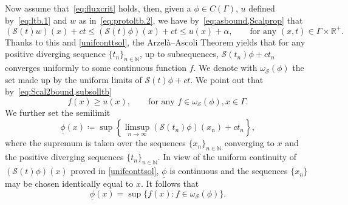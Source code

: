 \documentclass[11pt,a4paper,american]{article}
\newcommand{\Nds}{\mathds N}
\newcommand{\Rds}{\mathds R}
\newcommand{\Scal}{\mathcal S}
\newcommand{\unphi}{\underline\phi}
\begin{document}
    Now assume that~\cref{eq:fluxcrit} holds, then, given a $\phi\in C(\Gamma)$, $u$ defined by~\cref{eq:ltb.1} and $w$ as in~\cref{eq:protoltb.2}, we have by~\cref{eq:asbound,Scalprop} that
    \begin{equation}\label{eq:Scal2bound}
        (\Scal(t)w)(x)+ct\le(\Scal(t)\phi)(x)+ct\le u(x)+\alpha,\qquad\text{for any }(x,t)\in\Gamma\times\Rds^+.
    \end{equation}
    Thanks to this and \cref{unifconttsol}, the Arzelà--Ascoli Theorem yields that for any positive diverging sequence $\{t_n\}_{n\in\Nds}$, up to subsequences, $\Scal(t_n)\phi+ct_n$ converges uniformly to some continuous function $f$. We denote with $\omega_\Scal(\phi)$ the set made up by the uniform limits of $\Scal(t)\phi+ct$. We point out that by~\cref{eq:Scal2bound,subsolltb}
    \begin{equation}\label{eq:omegalbound}
        f(x)\ge u(x),\qquad\text{for any }f\in\omega_\Scal(\phi),x\in\Gamma.
    \end{equation}
    We further set the semilimit
    \begin{equation}\label{eq:limsuptsol}
        \unphi(x)\coloneqq\sup\left\{\limsup_{n\to\infty}(\Scal(t_n)\phi)(x_n)+ct_n\right\},
    \end{equation}
    where the supremum is taken over the sequences $\{x_n\}_{n\in\Nds}$ converging to $x$ and the positive diverging sequences $\{t_n\}_{n\in\Nds}$. In view of the uniform continuity of $(\Scal(t)\phi)(x)$ proved in \cref{unifconttsol}, $\unphi$ is continuous and the sequences $\{x_n\}$ may be chosen identically equal to $x$. It follows that
    \begin{equation}\label{eq:unphisup}
        \unphi(x)=\sup\{f(x):f\in\omega_\Scal(\phi)\}.
    \end{equation}
\end{document}
